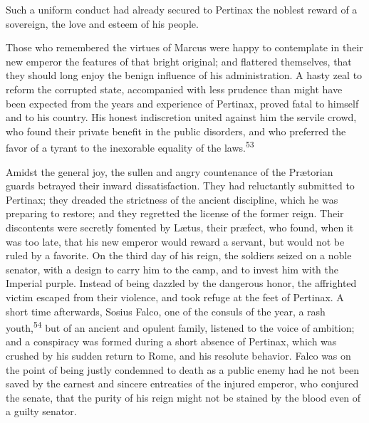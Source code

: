 
Such a uniform conduct had already secured to Pertinax the
noblest reward of a sovereign, the love and esteem of his people.

Those who remembered the virtues of Marcus were happy to
contemplate in their new emperor the features of that bright
original; and flattered themselves, that they should long enjoy
the benign influence of his administration. A hasty zeal to
reform the corrupted state, accompanied with less prudence than
might have been expected from the years and experience of
Pertinax, proved fatal to himself and to his country. His honest
indiscretion united against him the servile crowd, who found
their private benefit in the public disorders, and who preferred
the favor of a tyrant to the inexorable equality of the laws.\textsuperscript{53}


Amidst the general joy, the sullen and angry countenance of the
Prætorian guards betrayed their inward dissatisfaction. They had
reluctantly submitted to Pertinax; they dreaded the strictness of
the ancient discipline, which he was preparing to restore; and
they regretted the license of the former reign. Their discontents
were secretly fomented by Lætus, their præfect, who found, when
it was too late, that his new emperor would reward a servant, but
would not be ruled by a favorite. On the third day of his reign,
the soldiers seized on a noble senator, with a design to carry
him to the camp, and to invest him with the Imperial purple.
Instead of being dazzled by the dangerous honor, the affrighted
victim escaped from their violence, and took refuge at the feet
of Pertinax. A short time afterwards, Sosius Falco, one of the
consuls of the year, a rash youth,\textsuperscript{54} but of an ancient and
opulent family, listened to the voice of ambition; and a
conspiracy was formed during a short absence of Pertinax, which
was crushed by his sudden return to Rome, and his resolute
behavior. Falco was on the point of being justly condemned to
death as a public enemy had he not been saved by the earnest and
sincere entreaties of the injured emperor, who conjured the
senate, that the purity of his reign might not be stained by the
blood even of a guilty senator.


